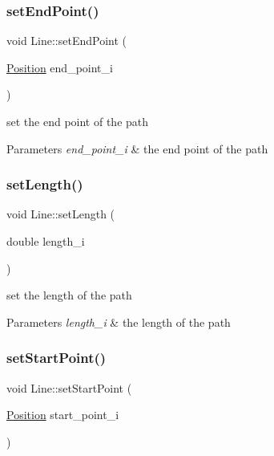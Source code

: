 \subsubsection{\texorpdfstring{set\+End\+Point()}{setEndPoint()}}
{\footnotesize\ttfamily void Line\+::set\+End\+Point (\begin{DoxyParamCaption}\item[{\mbox{\hyperlink{class_position}{Position}}}]{end\+\_\+point\+\_\+i }\end{DoxyParamCaption})}



set the end point of the path 


\begin{DoxyParams}{Parameters}
{\em end\+\_\+point\+\_\+i} & the end point of the path \\
\hline
\end{DoxyParams}
\mbox{\label{class_line_a387afc9536a3c054dec9eb54f45ea993}} 
\subsubsection{\texorpdfstring{set\+Length()}{setLength()}}
{\footnotesize\ttfamily void Line\+::set\+Length (\begin{DoxyParamCaption}\item[{double}]{length\+\_\+i }\end{DoxyParamCaption})}



set the length of the path 


\begin{DoxyParams}{Parameters}
{\em length\+\_\+i} & the length of the path \\
\hline
\end{DoxyParams}
\mbox{\label{class_line_a6356eecffc24d5016c9aa697611c3020}} 
\subsubsection{\texorpdfstring{set\+Start\+Point()}{setStartPoint()}}
{\footnotesize\ttfamily void Line\+::set\+Start\+Point (\begin{DoxyParamCaption}\item[{\mbox{\hyperlink{class_position}{Position}}}]{start\+\_\+point\+\_\+i }\end{DoxyParamCaption})}



